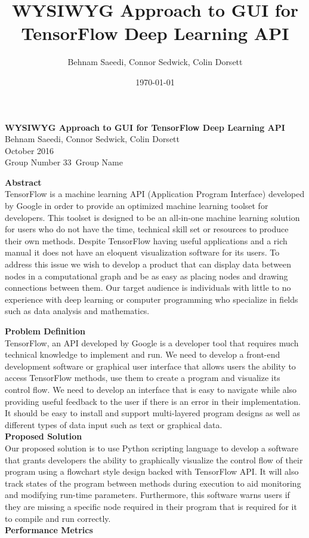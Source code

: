 \documentclass[a4paper,10pt]{IEEETran}
\title{WYSIWYG Approach to GUI for TensorFlow Deep Learning API}
\author{Behnam Saeedi, Connor Sedwick, Colin Dorsett}
\date{\today}
\newcommand*\Title{WYSIWYG Approach to GUI for TensorFlow Deep Learning API}
\newcommand*\Date{October 2016}
\newcommand*\Author{Behnam Saeedi, Connor Sedwick, Colin Dorsett}
\newcommand*\GroupNumber{Group Number 33}
\newcommand*\GroupName{Group Name}
\begin{document}
	\begin{titlepage}
		\vspace*{\fill}
			\begin{center}
				\noindent \textbf{\Huge\Title} \\
				\large\Author \\
				\large\Date \\
				\large\GroupNumber \, \large\GroupName
			\end{center}
			\noindent \textbf{Abstract} \\
			\indent TensorFlow is a machine learning API (Application Program Interface) developed by Google in order to provide an optimized machine learning toolset for developers.
			 This toolset is designed to be an all-in-one machine learning solution for users who do not have the time, technical skill set or resources to produce their own methods.
			 Despite TensorFlow having useful applications and a rich manual it does not have an eloquent visualization software for its users.
			 To address this issue we wish to develop a product that can display data between nodes in a computational graph and be as easy as placing nodes and drawing connections between them. Our target audience is individuals with little to no experience with deep learning or computer programming who specialize in fields such as data analysis and mathematics.\\
		\vspace*{\fill}
	\end{titlepage}

	\noindent \textbf{Problem Definition}\\
	\indent TensorFlow, an API developed by Google is a developer tool that requires much technical knowledge to implement and run.
	 We need to develop a front-end development software or graphical user interface that allows users the ability to access TensorFlow methods, use them to create a program and visualize its control flow.
	 We need to develop an interface that is easy to navigate while also providing useful feedback to the user if there is an error in their implementation.
	 It should be easy to install and support multi-layered program designs as well as different types of data input such as text or graphical data.\\

	\noindent \textbf{Proposed Solution}\\
	\indent Our proposed solution is to use Python scripting language to develop a software that grants developers the ability to graphically visualize the control flow of their program using a flowchart style design backed with TensorFlow API.
	 It will also track states of the program between methods during execution to aid monitoring and modifying run-time parameters.
	 Furthermore, this software warns users if they are missing a specific node required in their program that is required for it to compile and run correctly.\\

	\noindent \textbf{Performance Metrics}\\
	\indent 
\end{document}
